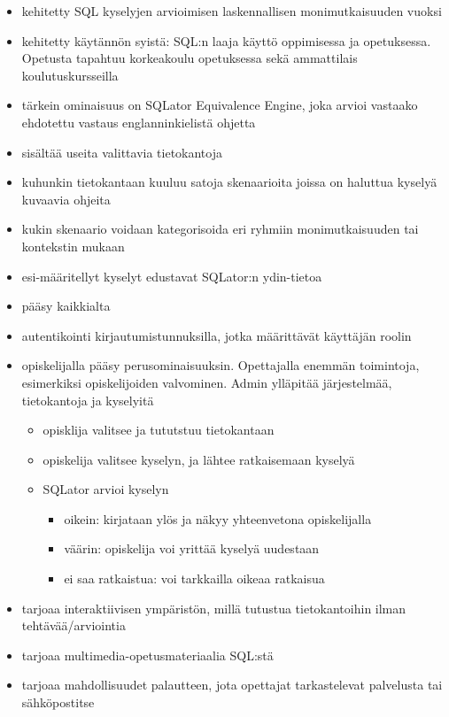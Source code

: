 \documentclass[finnish,twoside,openright]{HYgraduMLDS}
\begin{document}
\begin{itemize}
    \item kehitetty SQL kyselyjen arvioimisen laskennallisen monimutkaisuuden vuoksi
    \item kehitetty käytännön syistä: SQL:n laaja käyttö oppimisessa ja opetuksessa. Opetusta tapahtuu korkeakoulu opetuksessa sekä ammattilais koulutuskursseilla
    \item tärkein ominaisuus on SQLator Equivalence Engine, joka arvioi vastaako ehdotettu vastaus englanninkielistä ohjetta
    \item sisältää useita valittavia tietokantoja
    \item kuhunkin tietokantaan kuuluu satoja skenaarioita joissa on haluttua kyselyä kuvaavia ohjeita
    \item kukin skenaario voidaan kategorisoida eri ryhmiin monimutkaisuuden tai kontekstin mukaan
    \item esi-määritellyt kyselyt edustavat SQLator:n ydin-tietoa
    \item pääsy kaikkialta
    \item autentikointi kirjautumistunnuksilla, jotka määrittävät käyttäjän roolin
    \item opiskelijalla pääsy perusominaisuuksin. Opettajalla enemmän toimintoja, esimerkiksi opiskelijoiden valvominen. Admin ylläpitää järjestelmää, tietokantoja ja kyselyitä
    \begin{itemize}
        \item opisklija valitsee ja tututstuu tietokantaan
        \item opiskelija valitsee kyselyn, ja lähtee ratkaisemaan kyselyä
        \item SQLator arvioi kyselyn
        \begin{itemize}
            \item oikein: kirjataan ylös ja näkyy yhteenvetona opiskelijalla
            \item väärin: opiskelija voi yrittää kyselyä uudestaan
            \item ei saa ratkaistua: voi tarkkailla oikeaa ratkaisua
        \end{itemize}
    \end{itemize}
    \item tarjoaa interaktiivisen ympäristön, millä tutustua tietokantoihin ilman tehtävää/arviointia
    \item tarjoaa multimedia-opetusmateriaalia SQL:stä
    \item tarjoaa mahdollisuudet palautteen, jota opettajat tarkastelevat palvelusta tai sähköpostitse

\end{itemize}
\end{document}
